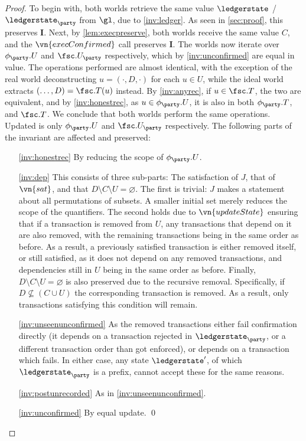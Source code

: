 \fussy
\begin{proof}
  To begin with, both worlds retrieve the same value $\ledgerstate$ /
  $\ledgerstate_\party$ from $\gl$, due to \ref{inv:ledger}. As seen in
  \autoref{sec:proof}, this preserves $\boldsymbol I$. Next, by
  \autoref{lem:execpreserve}, both worlds receive the same value $C$, and the
  $\vn{execConfirmed}$ call preserves $\boldsymbol I$. The worlds now iterate over
  $\phi_\party.U$ and $\fsc.U_\party$ respectively, which by
  \ref{inv:unconfirmed} are equal in value. The operations performed are almost
  identical, with the exception of the real world deconstructing $u = (\cdot, D,
  \cdot)$ for each $u \in U$, while the ideal world extracts $(\ldots, D) =
  \fsc.T(u)$ instead. By \ref{inv:anyrec}, if $u \in \fsc.T$, the two are
  equivalent, and by \ref{inv:honestrec}, as $u \in \phi_\party.U$, it is also
  in both $\phi_\party.T$, and $\fsc.T$. We conclude that both worlds perform
  the same operations. Updated is only $\phi_\party.U$ and $\fsc.U_\party$
  respectively. The following parts of the invariant are affected and preserved:

  \begin{enumerate}
    \item[\ref{inv:honestrec}] By reducing the scope of $\phi_\party.U$.
    \item[\ref{inv:dep}] This consists of three sub-parts: The satisfaction of
      $J$, that of $\vn{sat}$, and that $D \setminus C \setminus U =
      \varnothing$. The first is trivial: $J$ makes a statement about all
      permutations of subsets. A smaller initial set merely reduces the scope of
      the quantifiers. The second holds due to $\vn{updateState}$ ensuring that
      if a transaction is removed from $U$, any transactions that depend on it
      are also removed, with the remaining transactions being in the same order
      as before. As a result, a previously satisfied transaction is either
      removed itself, or still satisfied, as it does not depend on any removed
      transactions, and dependencies still in $U$ being in the same order as
      before. Finally, $D \setminus C \setminus U = \varnothing$ is also
      preserved due to the recursive removal. Specifically, if $D \nsubseteq (C
      \cup U)$ the corresponding transaction is removed. As a result, only
      transactions satisfying this condition will remain.
    \item[\ref{inv:unseenunconfirmed}] As the removed transactions either fail
      confirmation directly (it depends on a transaction rejected in
      $\ledgerstate_\party$, or a different transaction order than got
      enforced), or depends on a transaction which fails. In either case, any
      state $\ledgerstate'$, of which $\ledgerstate_\party$ is a prefix, cannot
      accept these for the same reasons.
    \item[\ref{inv:postunrecorded}] As in \ref{inv:unseenunconfirmed}.
    \item[\ref{inv:unconfirmed}] By equal update.
  \qed
  \end{enumerate}
\end{proof}

